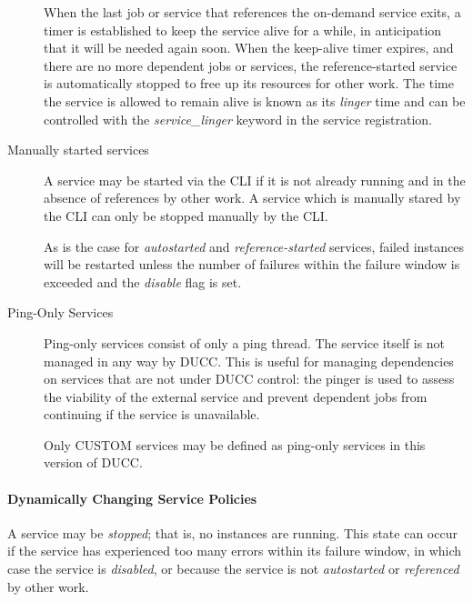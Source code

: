 \begin{description}
           When the last job or service that references the on-demand service exits, a timer is
           established to keep the service alive for a while, in anticipation that it will be needed
           again soon.  When the keep-alive timer expires, and there are no more dependent jobs or
           services, the reference-started service is automatically stopped to free up its resources
           for other work.  The time the service is allowed to remain alive is known as its
           {\em linger} time and can be controlled with the {\em service\_linger} keyword in the
           service registration.

        \item[Manually started services] A service may be started via the CLI if it is not
          already running and in the absence of references by other work.  A service which is
          manually stared by the CLI can only be stopped manually by the CLI.

          As is the case for {\em autostarted} and {\em reference-started} services, failed 
          instances will be restarted unless the number of failures within the failure window
          is exceeded and the {\em disable} flag is set.  

        \item[Ping-Only Services] 
          \label{subsub:services.ping-only}
          Ping-only services consist of only
          a ping thread.  The service itself is not managed in any way by DUCC.  This is useful for
          managing dependencies on services that are not under DUCC control: the pinger is used
          to assess the viability of the external service and prevent dependent jobs from
          continuing if the service is unavailable.

          Only CUSTOM services may be defined as ping-only services in this version of DUCC.

      \end{description}

      \paragraph{Dynamically Changing Service Policies}
      A service may be {\em stopped}; that is, no instances are running.  This state can occur
      if the service has experienced too many errors within its failure window, in which case
      the service is {\em disabled}, or because the service is not {\em autostarted} or {\em referenced} by
      other work. 

